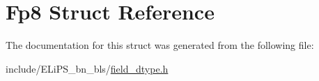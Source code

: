 \hypertarget{struct_fp8}{}\section{Fp8 Struct Reference}
\label{struct_fp8}


The documentation for this struct was generated from the following file\+:\begin{DoxyCompactItemize}
\item 
include/\+E\+Li\+P\+S\+\_\+bn\+\_\+bls/\hyperlink{field__dtype_8h}{field\+\_\+dtype.\+h}\end{DoxyCompactItemize}
